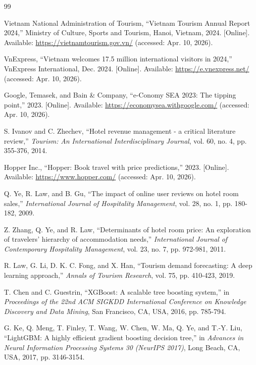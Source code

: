 \documentclass[12pt,a4paper]{report}
\begin{document}
\begin{thebibliography}{99}

Vietnam National Administration of Tourism, ``Vietnam Tourism Annual Report 2024,'' Ministry of Culture, Sports and Tourism, Hanoi, Vietnam, 2024. [Online]. Available: \url{https://vietnamtourism.gov.vn/} (accessed: Apr. 10, 2026).

VnExpress, ``Vietnam welcomes 17.5 million international visitors in 2024,'' VnExpress International, Dec. 2024. [Online]. Available: \url{https://e.vnexpress.net/} (accessed: Apr. 10, 2026).

Google, Temasek, and Bain \& Company, ``e-Conomy SEA 2023: The tipping point,'' 2023. [Online]. Available: \url{https://economysea.withgoogle.com/} (accessed: Apr. 10, 2026).

S. Ivanov and C. Zhechev, ``Hotel revenue management - a critical literature review,'' \textit{Tourism: An International Interdisciplinary Journal}, vol. 60, no. 4, pp. 355-376, 2014.

Hopper Inc., ``Hopper: Book travel with price predictions,'' 2023. [Online]. Available: \url{https://www.hopper.com/} (accessed: Apr. 10, 2026).

Q. Ye, R. Law, and B. Gu, ``The impact of online user reviews on hotel room sales,'' \textit{International Journal of Hospitality Management}, vol. 28, no. 1, pp. 180-182, 2009.

Z. Zhang, Q. Ye, and R. Law, ``Determinants of hotel room price: An exploration of travelers' hierarchy of accommodation needs,'' \textit{International Journal of Contemporary Hospitality Management}, vol. 23, no. 7, pp. 972-981, 2011.

R. Law, G. Li, D. K. C. Fong, and X. Han, ``Tourism demand forecasting: A deep learning approach,'' \textit{Annals of Tourism Research}, vol. 75, pp. 410-423, 2019.

T. Chen and C. Guestrin, ``XGBoost: A scalable tree boosting system,'' in \textit{Proceedings of the 22nd ACM SIGKDD International Conference on Knowledge Discovery and Data Mining}, San Francisco, CA, USA, 2016, pp. 785-794.

G. Ke, Q. Meng, T. Finley, T. Wang, W. Chen, W. Ma, Q. Ye, and T.-Y. Liu, ``LightGBM: A highly efficient gradient boosting decision tree,'' in \textit{Advances in Neural Information Processing Systems 30 (NeurIPS 2017)}, Long Beach, CA, USA, 2017, pp. 3146-3154.


\end{thebibliography}
\end{document}
